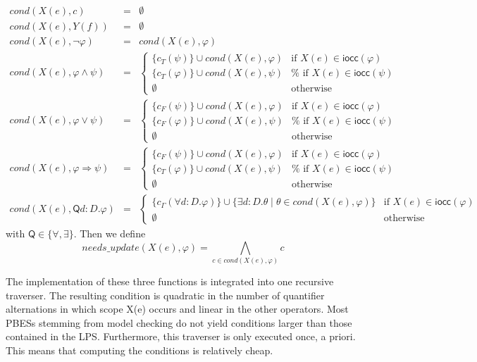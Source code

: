 \begin{equation*}
\begin{array}{lll}
cond(X(e),c) & = & \emptyset \\
cond(X(e),Y(f)) & = & \emptyset \\
cond(X(e),\lnot \varphi) & = & cond(X(e),\varphi) \\
cond(X(e),\varphi \land \psi) & = & \left\{
\begin{array}{ll}
\{c_{T}(\psi)\}\cup cond(X(e),\varphi) &
\text{if }X(e)\in \mathsf{iocc}(\varphi) \\
\{c_{T}(\varphi)\}\cup cond(X(e),\psi) & \text{%
if }X(e)\in \mathsf{iocc}(\psi) \\
\emptyset & \text{otherwise}%
\end{array}%
\right. \\
cond(X(e),\varphi \lor \psi) & = & \left\{
\begin{array}{ll}
\{c_{F}(\psi)\}\cup cond(X(e),\varphi) &
\text{if }X(e)\in \mathsf{iocc}(\varphi) \\
\{c_{F}(\varphi)\}\cup cond(X(e),\psi) & \text{%
if }X(e)\in \mathsf{iocc}(\psi) \\
\emptyset & \text{otherwise}%
\end{array}%
\right. \\
cond(X(e),\varphi \Rightarrow \psi) & = & \left\{
\begin{array}{ll}
\{c_{F}(\psi)\}\cup cond(X(e),\varphi) &
\text{if }X(e)\in \mathsf{iocc}(\varphi) \\
\{c_{T}(\varphi)\}\cup cond(X(e),\psi) & \text{%
if }X(e)\in \mathsf{iocc}(\psi) \\
\emptyset & \text{otherwise}%
\end{array}%
\right. \\
cond(X(e),\mathsf{Q}d:{D}.\varphi) & = & \left\{
\begin{array}{ll}
\{c_{\Gamma}(\forall d:{D}.\varphi)\}\cup \{\exists d:{D}.\theta \mid
\theta \in cond(X(e),\varphi)\} & \text{if }X(e)\in \mathsf{iocc}%
(\varphi) \\
\emptyset & \text{otherwise}%
\end{array}%
\right.
\end{array}%
\end{equation*}%
with $\mathsf{Q} \in \{\forall, \exists\}$. Then we define%
\begin{equation*}
\mathit{needs\_update}(X(e),\varphi )=\bigwedge_{c\in cond(X(e),\varphi
)} c
\end{equation*}

The implementation of these three functions is integrated into one recursive
traverser. The resulting condition is quadratic in the number of quantifier
alternations in which scope X(e) occurs and linear in the other operators. Most
PBESs stemming from model checking do not yield conditions larger than those
contained in the LPS. Furthermore, this traverser is only executed once, a
priori. This means that computing the conditions is relatively cheap.
\newpage
